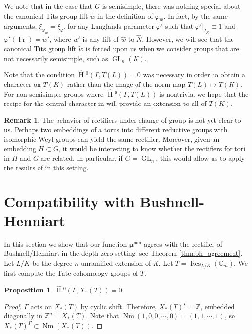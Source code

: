 \documentclass[11pt]{amsart}
\theoremstyle{plain}
\newtheorem{proposition}[theorem]{Proposition}
\newcommand{\HT}[1]{\hat{\HH}{}^{#1}}
\theoremstyle{definition}
\newtheorem{remark}[theorem]{Remark}
\DeclareMathOperator{\HH}{H}
\DeclareMathOperator{\Nm}{Nm}
\DeclareMathOperator{\Res}{Res}
\DeclareMathOperator{\Fr}{Fr}
\DeclareMathOperator{\GL}{GL}
\newcommand{\Gm}{\mathbb{G}_m}
\newcommand{\bmu}{\boldsymbol\mu}
\newcommand{\mumin}{\bmu^{\min}}
\begin{document}
We note that in the
case that $G$ is semisimple, there was nothing special about
the canonical Tits group lift $\tilde{w}$ in the definition of $\varphi_{\hat{w}}$.
In fact, by the same arguments, $\xi_{\varphi_{\hat{w}}} = \xi_{\varphi'}$
for any Langlands parameter $\varphi'$ such that $\varphi'|_{I_K} \equiv 1$
and $\varphi'(\Fr) = w'$, where $w'$ is any lift of $\hat{w}$ to $\hat{N}$.
However, we will see that the canonical Tits group lift $\tilde{w}$ is forced upon us when we
consider groups that are not necessarily semisimple, such as $\GL_{n}(K)$.

Note that the condition $\HT{0}(\Gamma, T(L)) = 0$ was necessary in order to obtain a character on $T(K)$ rather
than the image of the norm map $T(L) \mapsto T(K)$.  For non-semisimple groups where $\HT{0}(\Gamma, T(L))$
is nontrivial we hope that the recipe for the central character in \cite{gross-reeder:09a} will provide an extension to all of $T(K)$.

\begin{remark}
The behavior of rectifiers under change of group is not yet clear to us.  Perhaps two embeddings of a torus into
different reductive groups with isomorphic Weyl groups can yield the same rectifier.  Moreover, given an embedding
$H \subset G$, it would be interesting to know whether the rectifiers for tori in $H$ and $G$ are related.  In particular, if $G = \GL_n$, this would allow us to apply the results of \cite{bushnell-henniart:10a} in this setting.
\end{remark}

\section{Compatibility with Bushnell-Henniart} \label{section:BH_compat}

In this section we show that our function $\mumin$
agrees with the rectifier of Bushnell/Henniart in the depth
zero setting: see Theorem \ref{thm:bh_agreement}.
Let $L/K$ be the degree $n$ unramified extension of $K$.
Let $T = \Res_{L/K}(\Gm)$.  We first compute the Tate cohomology groups of $T$.

\begin{proposition}
$\HT{0}(\Gamma, X_*(T)) = 0$.
\end{proposition}

\begin{proof}
$\Gamma$ acts on $X_*(T)$ by cyclic shift.
Therefore, $X_*(T)^{\Gamma} = \mathbb{Z}$, embedded diagonally in
$\mathbb{Z}^n = X_*(T)$.  Note that $\Nm(1,0,0,\cdots,0) = (1,1,\cdots,1)$, so
$X_*(T)^{\Gamma} \subset \Nm(X_*(T))$.
\end{proof}
\end{document}
